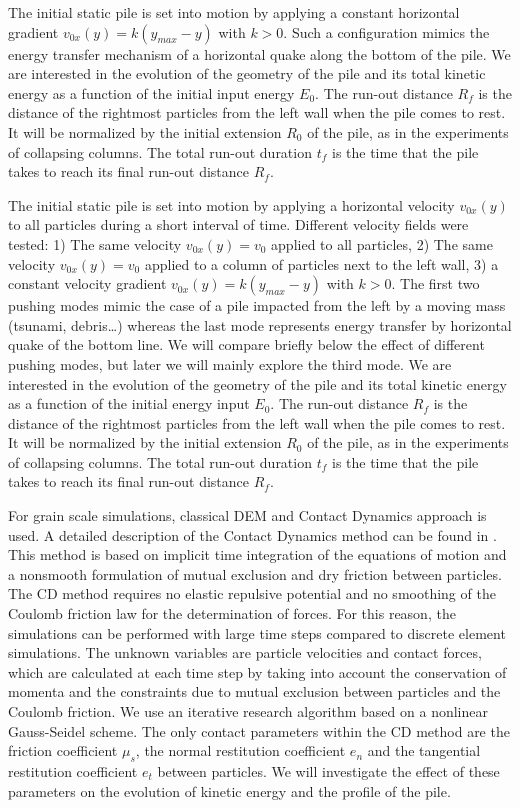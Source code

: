 The initial static pile is set into motion by applying a constant horizontal
gradient  $v_{0x}(y) = k (y_{max} - y)$ with $k>0$. Such a configuration 
mimics the energy transfer mechanism of a horizontal quake along the bottom of 
the pile. We are interested in the evolution of the geometry of the pile 
and its total kinetic energy as a function of the initial input energy $E_0$. 
The run-out distance $R_f$ is the distance of the rightmost particles 
from the left wall when the pile comes to rest.  It will be normalized by the 
initial extension $R_0$ of the pile, as in the experiments of collapsing 
columns. The total run-out duration $t_f$ is the time that the pile takes to 
reach its final run-out distance $R_f$.

The initial static pile is set into motion by applying a horizontal velocity 
$v_{0x}(y)$ to all particles during a short interval of time. Different 
velocity fields were tested: 1) The same velocity $v_{0x}(y) = v_0$ applied to 
all particles, 2) The same velocity $v_{0x}(y) = v_0$ applied to a column of 
particles next to the left wall, 3) a constant velocity gradient  $v_{0x}(y) = 
k (y_{max} - y)$ with $k>0$. The first two pushing modes mimic the case of a 
pile impacted from the left by a moving mass (tsunami, debris\dots) whereas the 
last mode represents energy transfer by horizontal quake of the bottom line. We 
will compare briefly below the effect of different pushing modes, but later we 
will mainly explore the third mode. We are interested in the evolution of the 
geometry of the pile and its total kinetic energy as a function of the initial 
energy input $E_0$. The run-out distance $R_f$ is the distance of the rightmost 
particles from the left wall when the pile comes to rest.  
It will be normalized by the initial extension $R_0$ of the pile, as in 
the experiments of collapsing columns. The total run-out duration $t_f$ is the 
time that the pile takes to reach its final run-out distance $R_f$.       

For grain scale simulations, classical DEM and Contact 
Dynamics approach is used. 
A detailed description of the Contact Dynamics 
method can be found in \cite{Moreau1993,Jean1999,Radjai2009,Radjai2011}. 
This method is based on implicit time integration of the equations of motion 
and a nonsmooth formulation of mutual exclusion and dry friction between 
particles. The CD method requires no elastic repulsive potential and no 
smoothing of the Coulomb friction law for the determination of forces. 
For this reason, the simulations can be performed with large time steps 
compared to discrete element simulations. The unknown variables are particle 
velocities and contact forces, which are calculated at each time step by taking 
into account the conservation of momenta and the constraints due to mutual 
exclusion between particles and the Coulomb friction. We use an iterative 
research algorithm based on a nonlinear Gauss-Seidel scheme. The only contact 
parameters within the CD method are the friction coefficient $\mu_s$, the 
normal restitution coefficient $e_n$ and the tangential restitution coefficient 
$e_t$ between particles. We will investigate the effect of these parameters on 
the evolution of kinetic energy and the profile of the pile.     
  
